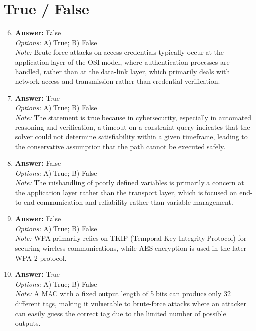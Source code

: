 \documentclass[12pt]{article}
\begin{document}
\section*{True / False}
\begin{enumerate}[label=\arabic*.]
\setcounter{enumi}{5}
\item \textbf{Answer:} False
\\ \textit{Options:} A) True; B) False
\\ \textit{Note:} Brute-force attacks on access credentials typically occur at the application layer of the OSI model, where authentication processes are handled, rather than at the data-link layer, which primarily deals with network access and transmission rather than credential verification.
\item \textbf{Answer:} True
\\ \textit{Options:} A) True; B) False
\\ \textit{Note:} The statement is true because in cybersecurity, especially in automated reasoning and verification, a timeout on a constraint query indicates that the solver could not determine satisfiability within a given timeframe, leading to the conservative assumption that the path cannot be executed safely.
\item \textbf{Answer:} False
\\ \textit{Options:} A) True; B) False
\\ \textit{Note:} The mishandling of poorly defined variables is primarily a concern at the application layer rather than the transport layer, which is focused on end-to-end communication and reliability rather than variable management.
\item \textbf{Answer:} False
\\ \textit{Options:} A) True; B) False
\\ \textit{Note:} WPA primarily relies on TKIP (Temporal Key Integrity Protocol) for securing wireless communications, while AES encryption is used in the later WPA 2 protocol.
\item \textbf{Answer:} True
\\ \textit{Options:} A) True; B) False
\\ \textit{Note:} A MAC with a fixed output length of 5 bits can produce only 32 different tags, making it vulnerable to brute-force attacks where an attacker can easily guess the correct tag due to the limited number of possible outputs.
\end{enumerate}
\end{document}
